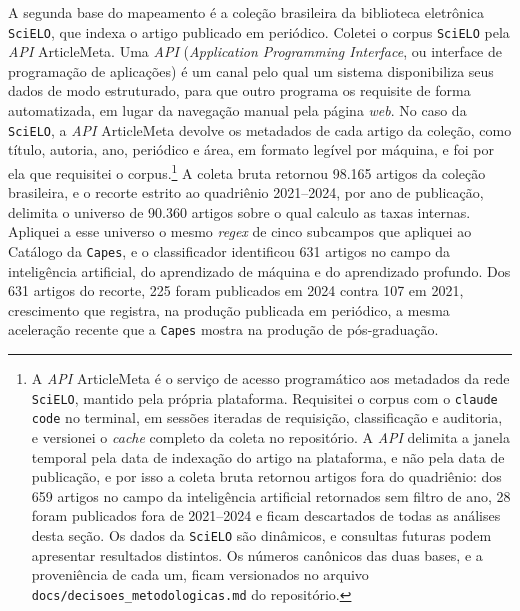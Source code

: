 A segunda base do mapeamento é a coleção brasileira da biblioteca eletrônica \texttt{SciELO}, que indexa o artigo publicado em periódico. Coletei o corpus \texttt{SciELO} pela \emph{API} ArticleMeta. Uma \emph{API} (\emph{Application Programming Interface}, ou interface de programação de aplicações) é um canal pelo qual um sistema disponibiliza seus dados de modo estruturado, para que outro programa os requisite de forma automatizada, em lugar da navegação manual pela página \emph{web}. No caso da \texttt{SciELO}, a \emph{API} ArticleMeta devolve os metadados de cada artigo da coleção, como título, autoria, ano, periódico e área, em formato legível por máquina, e foi por ela que requisitei o corpus.\footnote{A \emph{API} ArticleMeta é o serviço de acesso programático aos metadados da rede \texttt{SciELO}, mantido pela própria plataforma. Requisitei o corpus com o \texttt{claude code} no terminal, em sessões iteradas de requisição, classificação e auditoria, e versionei o \emph{cache} completo da coleta no repositório. A \emph{API} delimita a janela temporal pela data de indexação do artigo na plataforma, e não pela data de publicação, e por isso a coleta bruta retornou artigos fora do quadriênio: dos 659 artigos no campo da inteligência artificial retornados sem filtro de ano, 28 foram publicados fora de 2021--2024 e ficam descartados de todas as análises desta seção. Os dados da \texttt{SciELO} são dinâmicos, e consultas futuras podem apresentar resultados distintos. Os números canônicos das duas bases, e a proveniência de cada um, ficam versionados no arquivo \texttt{docs/decisoes\_metodologicas.md} do repositório.} A coleta bruta retornou 98.165 artigos da coleção brasileira, e o recorte estrito ao quadriênio 2021--2024, por ano de publicação, delimita o universo de 90.360 artigos sobre o qual calculo as taxas internas. Apliquei a esse universo o mesmo \emph{regex} de cinco subcampos que apliquei ao Catálogo da \texttt{Capes}, e o classificador identificou 631 artigos no campo da inteligência artificial, do aprendizado de máquina e do aprendizado profundo. Dos 631 artigos do recorte, 225 foram publicados em 2024 contra 107 em 2021, crescimento que registra, na produção publicada em periódico, a mesma aceleração recente que a \texttt{Capes} mostra na produção de pós-graduação.

